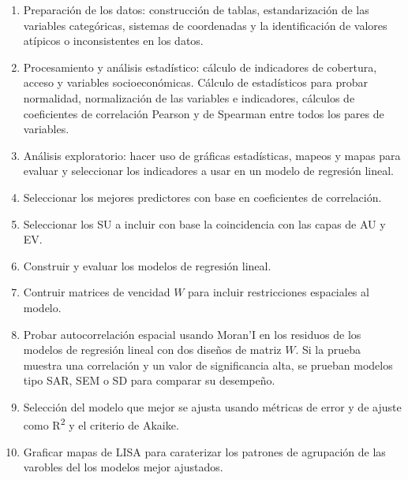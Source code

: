 \documentclass[12pt,a4paper,openany]{book}
\providecommand{\tightlist}{%
  \setlength{\itemsep}{0pt}\setlength{\parskip}{0pt}}
\theoremstyle{definition}
\theoremstyle{definition}
\theoremstyle{definition}
\theoremstyle{remark}
\begin{document}
\begin{enumerate}
\def\labelenumi{\arabic{enumi}.}
\tightlist
\item
  Preparación de los datos: construcción de tablas, estandarización de
  las variables categóricas, sistemas de coordenadas y la identificación
  de valores atípicos o inconsistentes en los datos.
\item
  Procesamiento y análisis estadístico: cálculo de indicadores de
  cobertura, acceso y variables socioeconómicas. Cálculo de estadísticos
  para probar normalidad, normalización de las variables e indicadores,
  cálculos de coeficientes de correlación Pearson y de Spearman entre
  todos los pares de variables.
\item
  Análisis exploratorio: hacer uso de gráficas estadísticas, mapeos y
  mapas para evaluar y seleccionar los indicadores a usar en un modelo
  de regresión lineal.
\item
  Seleccionar los mejores predictores con base en coeficientes de
  correlación.
\item
  Seleccionar los SU a incluir con base la coincidencia con las capas de
  AU y EV.
\item
  Construir y evaluar los modelos de regresión lineal.
\item
  Contruir matrices de vencidad \(W\) para incluir restricciones
  espaciales al modelo.
\item
  Probar autocorrelación espacial usando Moran'I en los residuos de los
  modelos de regresión lineal con dos diseños de matriz \(W\). Si la
  prueba muestra una correlación y un valor de significancia alta, se
  prueban modelos tipo SAR, SEM o SD para comparar su desempeño.
\item
  Selección del modelo que mejor se ajusta usando métricas de error y de
  ajuste como R\textsuperscript{2} y el criterio de Akaike.
\item
  Graficar mapas de LISA para caraterizar los patrones de agrupación de
  las varobles del los modelos mejor ajustados.
\end{enumerate}
\end{document}
